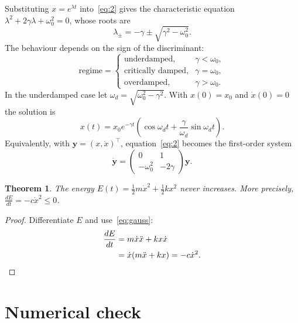 \documentclass[11pt,a4paper]{article}
\newtheorem{theorem}{Theorem}
\begin{document}
Substituting $x=e^{\lambda t}$ into~\eqref{eq:2} gives the characteristic equation $\lambda^{2}+2\gamma\lambda+\omega_{0}^{2}=0$, whose roots are
\begin{equation}
  \lambda_{\pm}=-\gamma\pm\sqrt{\gamma^{2}-\omega_{0}^{2}}.
\end{equation}
The behaviour depends on the sign of the discriminant:
\begin{equation*}
  \text{regime}=\begin{cases}
\text{underdamped,} & \gamma<\omega_{0}, \\
\text{critically damped,} & \gamma=\omega_{0}, \\
\text{overdamped,} & \gamma>\omega_{0}.
\end{cases}
\end{equation*}
In the underdamped case let $\omega_{d}=\sqrt{\omega_{0}^{2}-\gamma^{2}}$. With $x(0)=x_{0}$ and $\dot{x}(0)=0$ the solution is
\begin{equation}
  x(t)=x_{0}e^{-\gamma t}\left( \cos\omega_{d}t+\frac{\gamma}{\omega_{d}}\sin\omega_{d}t \right).
  \label{eq:cos-dsin}
\end{equation}
Equivalently, with $\mathbf{y}=(x,\dot{x})^{\top}$, equation~\eqref{eq:2} becomes the first-order system
\begin{equation}
  \dot{\mathbf{y}}=\begin{pmatrix}
0 & 1 \\
-\omega_{0}^{2} & -2\gamma
\end{pmatrix}\mathbf{y}.
\end{equation}

\begin{theorem}
  The energy $E(t)=\frac{1}{2}m\dot{x}^{2}+\frac{1}{2}kx^{2}$ never increases. More precisely, $\frac{dE}{dt}=-c\dot{x}^{2}\leq0$.
\end{theorem}

\begin{proof}
  Differentiate $E$ and use~\eqref{eq:gauss}:
\begin{align*}
  \frac{dE}{dt} &=m\dot{x}\ddot{x}+kx\dot{x} \\
   &=\dot{x}(m\ddot{x}+kx)=-c\dot{x}^{2}. \qedhere
\end{align*}
\end{proof}

\section{Numerical check}
\end{document}
